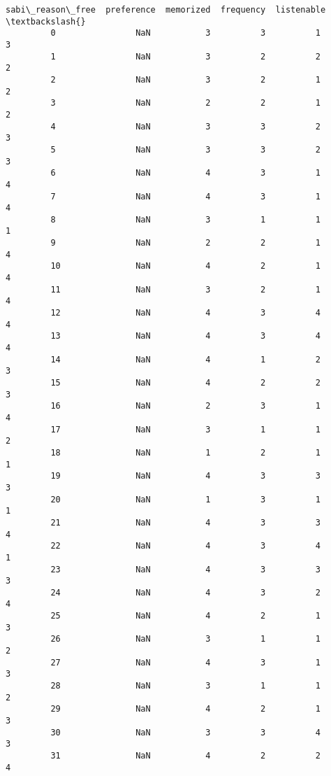 \documentclass[11pt]{article}
\begin{document}
\begin{Verbatim}[commandchars=\\\{\}]
             sabi\_reason\_free  preference  memorized  frequency  listenable  \textbackslash{}
         0                NaN           3          3          1           3   
         1                NaN           3          2          2           2   
         2                NaN           3          2          1           2   
         3                NaN           2          2          1           2   
         4                NaN           3          3          2           3   
         5                NaN           3          3          2           3   
         6                NaN           4          3          1           4   
         7                NaN           4          3          1           4   
         8                NaN           3          1          1           1   
         9                NaN           2          2          1           4   
         10               NaN           4          2          1           4   
         11               NaN           3          2          1           4   
         12               NaN           4          3          4           4   
         13               NaN           4          3          4           4   
         14               NaN           4          1          2           3   
         15               NaN           4          2          2           3   
         16               NaN           2          3          1           4   
         17               NaN           3          1          1           2   
         18               NaN           1          2          1           1   
         19               NaN           4          3          3           3   
         20               NaN           1          3          1           1   
         21               NaN           4          3          3           4   
         22               NaN           4          3          4           1   
         23               NaN           4          3          3           3   
         24               NaN           4          3          2           4   
         25               NaN           4          2          1           3   
         26               NaN           3          1          1           2   
         27               NaN           4          3          1           3   
         28               NaN           3          1          1           2   
         29               NaN           4          2          1           3   
         30               NaN           3          3          4           3   
         31               NaN           4          2          2           4   

\end{Verbatim}
\end{document}
